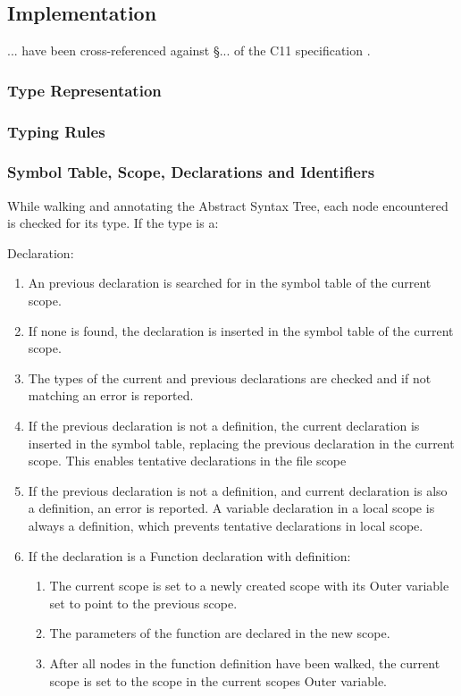 \subsection{Implementation}
... have been cross-referenced against §... of the C11 specification \cite{c11_spec}.

\subsubsection{Type Representation}

\subsubsection{Typing Rules}

\subsubsection{Symbol Table, Scope, Declarations and Identifiers}

While walking and annotating the Abstract Syntax Tree, each node encountered is checked for its type. If the type is a:

Declaration:
\begin{enumerate}
\item An previous declaration is searched for in the symbol table of the current scope.

\item If none is found, the declaration is inserted in the symbol table of the current scope.

\item The types of the current and previous declarations are checked and if not matching an error is reported.

\item If the previous declaration is not a definition, the current declaration is inserted in the symbol table, replacing the previous declaration in the current scope. This enables tentative declarations in the file scope

\item If the previous declaration is not a definition, and current declaration is also a definition, an error is reported. A variable declaration in a local scope is always a definition, which prevents tentative declarations in local scope.

\item If the declaration is a Function declaration with definition:

\begin{enumerate}[1.]
 \item The current scope is set to a newly created scope with its Outer variable set to point to the previous scope.

 \item The parameters of the function are declared in the new scope.

 \item After all nodes in the function definition have been walked, the current scope is set to the scope in the current scopes Outer variable.
\end{enumerate}
\end{enumerate}


